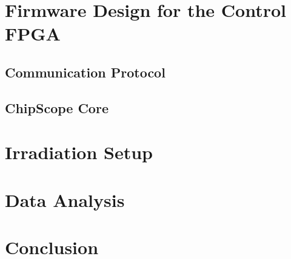   \section{Firmware Design for the Control FPGA}

    \subsection{Communication Protocol}

    \subsection{ChipScope Core}

  \section{Irradiation Setup}

  \section{Data Analysis}

  \section{Conclusion}
